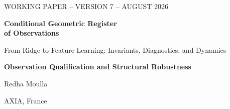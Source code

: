 \documentclass[10pt,a4paper]{article}
\begin{document}
\hypersetup{pageanchor=false}

\thispagestyle{empty}
\vspace*{1.25cm}
{\sffamily\color{teal}\fontsize{11.5}{14}\selectfont WORKING PAPER -- VERSION 7 -- AUGUST 2026\par}
\vspace{0.95cm}
{\sffamily\bfseries\color{black!88}\fontsize{24.5}{29}\selectfont Conditional Geometric Register\\of Observations\par}
\vspace{0.28cm}
{\sffamily\color{slate}\fontsize{16.2}{19}\selectfont From Ridge to Feature Learning: Invariants, Diagnostics, and Dynamics\par}
\vspace{0.22cm}
{\sffamily\bfseries\color{teal}\fontsize{11.2}{14}\selectfont Observation Qualification and Structural Robustness\par}
\vspace{0.68cm}
{\sffamily\fontsize{12}{14}\selectfont Redha Moulla\par}
{\sffamily\small\color{slate} AXIA, France\par}
\vspace{0.60cm}
\end{document}
